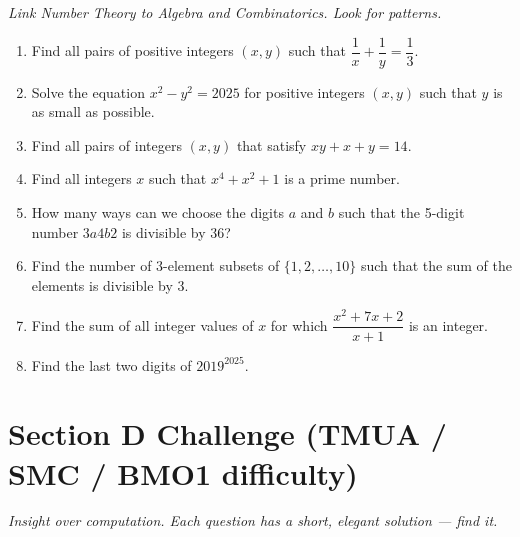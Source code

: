 \documentclass[11pt,a4paper]{article}
\begin{document}
\noindent\textit{Link Number Theory to Algebra and Combinatorics. Look for patterns.}

\begin{enumerate}

\item Find all pairs of positive integers $(x, y)$ such that $\dfrac{1}{x} + \dfrac{1}{y} = \dfrac{1}{3}$.

\item Solve the equation $x^2 - y^2 = 2025$ for positive integers $(x,y)$ such that $y$ is as small as possible.

\item Find all pairs of integers $(x,y)$ that satisfy $xy + x + y = 14$.

\item Find all integers $x$ such that $x^4 + x^2 + 1$ is a prime number.

\item How many ways can we choose the digits $a$ and $b$ such that the 5-digit number $3a4b2$ is divisible by $36$?

\item Find the number of 3-element subsets of $\{1, 2, \dots, 10\}$ such that the sum of the elements is divisible by $3$.

\item Find the sum of all integer values of $x$ for which $\dfrac{x^2+7x+2}{x+1}$ is an integer.

\item Find the last two digits of $2019^{2025}$.

\end{enumerate}

\section*{Section D \quad Challenge \hfill{\normalfont\small(TMUA / SMC / BMO1 difficulty)}}

\noindent\textit{Insight over computation. Each question has a short, elegant solution --- find it.}
\end{document}
